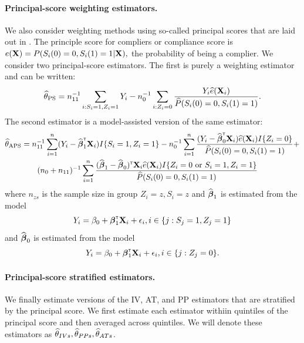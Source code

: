 \documentclass{article}
\def\siv{_{\text{IV}}}
\def\sps{_{\text{PS}}}
\def\saps{_{\text{APS}}}
\begin{document}
\paragraph{Principal-score weighting estimators.} We also consider weighting methods using so-called principal scores that are laid out in \cite{Ding2017}. The principle score for compliers or compliance score is $e({\bf X}) = P(S_i(0) = 0, S_i(1) = 1 | {\bf X}),$ the probability of being a complier. We consider two principal-score estimators. The first is purely a weighting estimator and can  be written:
\begin{align}
    \thetahat\sps = n_{11}\inv\sum_{i : S_i = 1, Z_i = 1} Y_i - n_0\inv\sum_{i : Z_i = 0} \frac{Y_i\ehat(\bX_i)}{\Phat(S_i(0) = 0, S_i(1) = 1)}.
\end{align}
The second estimator is a model-assisted version of the same estimator:
\begin{align}
    \thetahat\saps &= n_{11}\inv\sumin (Y_i - \bbetahat_1\trans\bX_i)I\{S_i = 1, Z_i = 1\} - n_{0}\inv\sumin \frac{(Y_i - \bbetahat_0\trans\bX_i)\ehat(\bX_i)I\{Z_i = 0\}}{\Phat(S_i(0) = 0, S_i(1) = 1)} +\\
    &\qquad (n_0 + n_{11})\inv\sumin \frac{(\bbetahat_1 - \bbetahat_0)\trans\bX_i\ehat(\bX_i)I\{Z_i = 0 \text{ or } S_i = 1, Z_i = 1\}}{\Phat(S_i(0) = 0, S_i(1) = 1)}
\end{align}
where $n_{zs}$ is the sample size in group $Z_i = z, S_i = z$ and ${\widehat{\boldsymbol{\beta}}}_1$ is estimated from the model
\[
Y_i = \beta_0 + \boldsymbol{\beta}_1^{{\sf \scriptscriptstyle{T}}}{\bf X}_i + \epsilon_i, i \in \{j : S_j = 1, Z_j = 1\}
\]
and ${\widehat{\boldsymbol{\beta}}}_0$ is estimated from the model
\[
Y_i = \beta_0 + \boldsymbol{\beta}_1^{{\sf \scriptscriptstyle{T}}}{\bf X}_i + \epsilon_i, i \in \{j : Z_j = 0\}.
\]

\paragraph{Principal-score stratified estimators.} We finally estimate versions of the IV, AT, and PP estimators that are stratified by the principal score. We first estimate each estimator withiin quintiles of the principal score and then averaged across quintiles. We will denote these estimators as ${\widehat\theta}_{IVs}, {\widehat\theta}_{PPs}, {\widehat\theta}_{ATs}$. 
\end{document}
